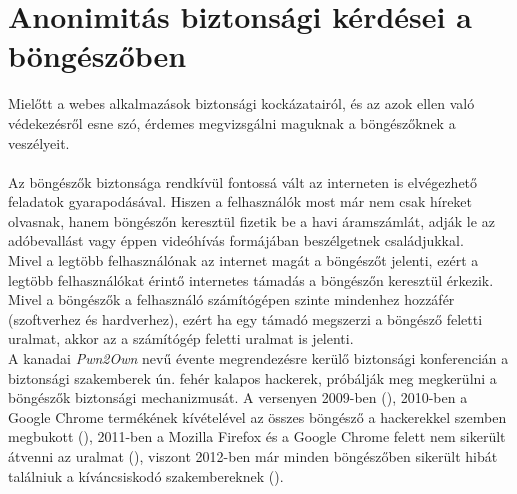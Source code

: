 
\section{Anonimitás biztonsági kérdései a böngészőben} %
\label{sect:anonimitás_biztonsági_kérdései_a_böngészőben}
Mielőtt a webes alkalmazások biztonsági kockázatairól, és az azok ellen való védekezésről esne szó, érdemes megvizsgálni maguknak a böngészőknek a veszélyeit.\hfill\\
\\
Az böngészők biztonsága rendkívül fontossá vált az interneten is elvégezhető feladatok gyarapodásával. Hiszen a felhasználók most már nem csak híreket olvasnak, hanem böngészőn keresztül fizetik be a havi áramszámlát, adják le az adóbevallást vagy éppen videóhívás formájában beszélgetnek családjukkal.\hfill\\
Mivel a legtöbb felhasználónak az internet magát a böngészőt jelenti, ezért a legtöbb felhasználókat érintő internetes támadás a böngészőn keresztül érkezik. Mivel a böngészők a felhasználó számítógépen szinte mindenhez hozzáfér (szoftverhez és hardverhez), ezért ha egy támadó megszerzi a böngésző feletti uralmat, akkor az a számítógép feletti uralmat is jelenti.\hfill\\
A kanadai \textit{Pwn2Own} nevű évente megrendezésre kerülő biztonsági konferencián a biztonsági szakemberek ún. fehér kalapos hackerek, próbálják meg megkerülni a böngészők biztonsági mechanizmusát. A versenyen 2009-ben (\cite{buhera_pwn2own_2009}), 2010-ben a Google Chrome termékének kívételével az összes böngésző a hackerekkel szemben megbukott (\cite{buhera_pwn2own_2010}), 2011-ben a Mozilla Firefox és a Google Chrome felett nem sikerült átvenni az uralmat (\cite{buhera_pwn2own_2011}), viszont 2012-ben már minden böngészőben sikerült hibát találniuk a kíváncsiskodó szakembereknek (\cite{buhera_pwn2own_2012}).

